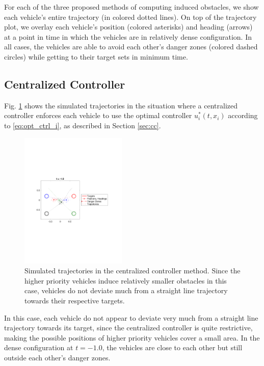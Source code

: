For each of the three proposed methods of computing induced obstacles, we show each vehicle's entire trajectory (in colored dotted lines). On top of the trajectory plot, we overlay each vehicle's position (colored asterisks) and heading (arrows) at a point in time in which the vehicles are in relatively dense configuration. In all cases, the vehicles are able to avoid each other's danger zones (colored dashed circles) while getting to their target sets in minimum time.

\subsection{Centralized Controller}
Fig. \ref{fig:cc_traj} shows the simulated trajectories in the situation where a centralized controller enforces each vehicle to use the optimal controller $u^*_i(t, x_i)$ according to \eqref{eq:opt_ctrl_i}, as described in Section \ref{sec:cc}.

\begin{figure}
  \centering
  \includegraphics[width=0.45\textwidth]{"fig/cc_traj"}
  \caption{Simulated trajectories in the centralized controller method. Since the higher priority vehicles induce relatively smaller obstacles in this case, vehicles do not deviate much from a straight line trajectory towards their respective targets.}
  \label{fig:cc_traj}
\end{figure}

In this case, each vehicle do not appear to deviate very much from a straight line trajectory towards its target, since the centralized controller is quite restrictive, making the possible positions of higher priority vehicles cover a small area. In the dense configuration at $t=-1.0$, the vehicles are close to each other but still outside each other's danger zones.

